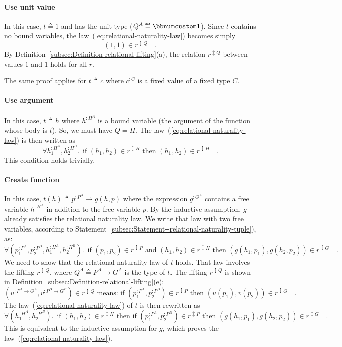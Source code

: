 \paragraph{Use unit value}

In this case, $t\triangleq1$ and has the unit type ($Q^{A}\triangleq\bbnum 1$).
Since $t$ contains no bound variables, the law~(\ref{eq:relational-naturality-law})
becomes simply
\[
(1,1)\in r^{\updownarrow Q}\quad.
\]
By Definition~\ref{subsec:Definition-relational-lifting}(a), the
relation $r^{\updownarrow Q}$ between values $1$ and $1$ holds
for all $r$.

The same proof applies for $t\triangleq c$ where $c^{:C}$ is a fixed
value of a fixed type $C$.

\paragraph{Use argument}

In this case, $t\triangleq h$ where $h^{:H^{A}}$ is a bound variable
(the argument of the function whose body is $t$). So, we must have
$Q=H$. The law~(\ref{eq:relational-naturality-law}) is then written
as
\[
\forall h_{1}^{:H^{A}},h_{2}^{:H^{B}}.\,\text{ if }(h_{1},h_{2})\in r^{\updownarrow H}\text{ then }(h_{1},h_{2})\in r^{\updownarrow H}\quad.
\]
This condition holds trivially.

\paragraph{Create function}

In this case, $t(h)\triangleq p^{:P^{A}}\rightarrow g(h,p)$ where
the expression $g^{:G^{A}}$ contains a free variable $h^{:H^{A}}$
in addition to the free variable $p$. By the inductive assumption,
$g$ already satisfies the relational naturality law. We write that
law with two free variables, according to Statement~\ref{subsec:Statement--relational-naturality-tuple}),
as:
\[
\forall(p_{1}^{:P^{A}},p_{2}^{:P^{B}},h_{1}^{:H^{A}},h_{2}^{:H^{B}}).\,\text{ if }(p_{1},p_{2})\in r^{\updownarrow P}\text{ and }(h_{1},h_{2})\in r^{\updownarrow H}\text{ then }(g(h_{1},p_{1}),g(h_{2},p_{2}))\in r^{\updownarrow G}\quad.
\]
We need to show that the relational naturality law of $t$ holds.
That law involves the lifting $r^{\updownarrow Q}$, where $Q^{A}\triangleq P^{A}\rightarrow G^{A}$
is the type of $t$. The lifting $r^{\updownarrow Q}$ is shown in
Definition~\ref{subsec:Definition-relational-lifting}(e):
\[
(u^{:P^{A}\rightarrow G^{A}},v^{:P^{B}\rightarrow G^{B}})\in r^{\updownarrow Q}\text{ means: if }(p_{1}^{:P^{A}},p_{2}^{:P^{B}})\in r^{\updownarrow P}\text{ then }(u(p_{1}),v(p_{2}))\in r^{\updownarrow G}\quad.
\]
The law~(\ref{eq:relational-naturality-law}) of $t$ is then rewritten
as
\[
\forall(h_{1}^{:H^{A}},h_{2}^{:H^{B}}).\,\text{ if }(h_{1},h_{2})\in r^{\updownarrow H}\text{ then if }(p_{1}^{:P^{A}},p_{2}^{:P^{B}})\in r^{\updownarrow P}\text{ then }(g(h_{1},p_{1}),g(h_{2},p_{2}))\in r^{\updownarrow G}\quad.
\]
This is equivalent to the inductive assumption for $g$, which proves
the law~(\ref{eq:relational-naturality-law}).

